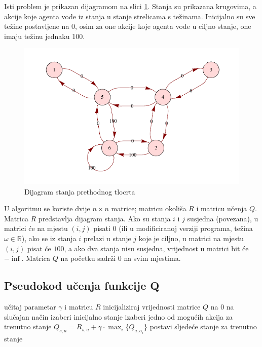 \documentclass[    DIV=calc, paper=a4,fontsize=11pt, twocolumn]{scrartcl}                     %
\begin{document}
Isti problem je prikazan dijagramom na slici \ref{fig:2}.
Stanja su prikazana krugovima, a akcije koje agenta vode iz stanja u stanje strelicama s težinama. Inicijalno su sve težine postavljene na $0$, osim za one akcije koje agenta vode u ciljno stanje, one imaju težinu jednaku 100.

\begin{figure}[h!]
\centering
\includegraphics[scale=0.8]{slike/R.pdf}
\caption{Dijagram stanja prethodnog tlocrta}
\label{fig:2}
\end{figure}

U algoritmu se koriste dvije $n \times n$ matrice; matricu okoliša $R$ i matricu učenja $Q$. Matrica $R$ predstavlja dijagram stanja. Ako su stanja $i$ i $j$ susjedna (povezana), u matrici će na mjestu $(i, j)$ pisati $0$ (ili u modificiranoj verziji programa, težina $\omega \in \mathbb{R}$), ako se iz stanja $i$ prelazi u stanje $j$ koje je ciljno, u matrici na mjestu $(i, j)$ pisat će $100$, a ako dva stanja nisu susjedna, vrijednost u matrici bit će $-\inf$. Matrica $Q$ na početku sadrži $0$ na svim mjestima.


\subsection*{Pseudokod učenja funkcije Q}
\begin{algorithmic}
\STATE učitaj parametar $\gamma$ i matricu $R$
\STATE inicijaliziraj vrijednosti matrice $Q$ na 0
\STATE na slučajan način izaberi inicijalno stanje
\STATE izaberi jedno od mogućih akcija za trenutno stanje
\STATE $Q_{s, a} = R_{s, a}+\gamma \cdot \max_i\{Q_{a, a_i}\}$
\STATE postavi sljedeće stanje za trenutno stanje
\ENDWHILE
\ENDWHILE
\end{algorithmic}
\end{document}
